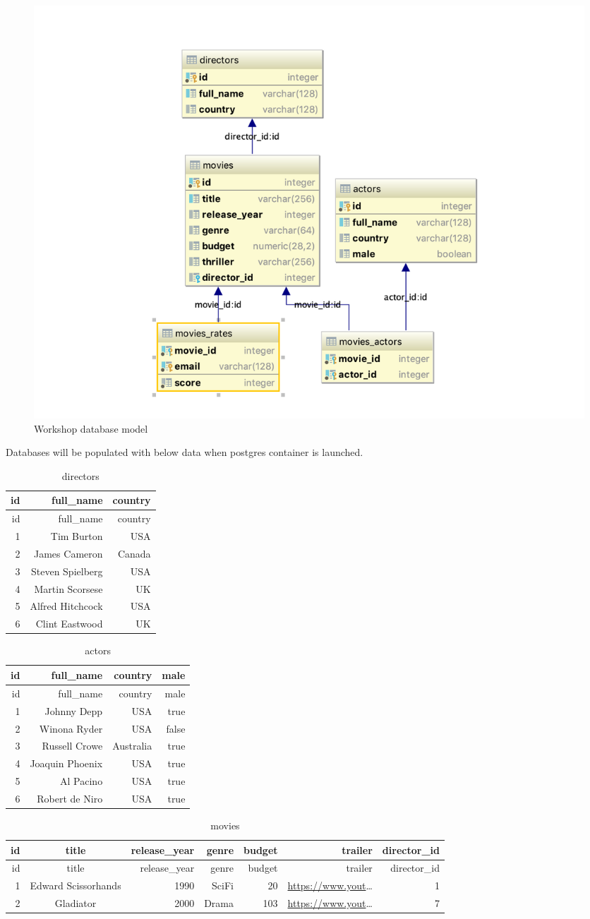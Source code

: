 \documentclass[]{book}
\begin{document}
\begin{figure}
\centering
\includegraphics{assets/database-model.png}
\caption{Workshop database model}
\end{figure}

Databases will be populated with below data when postgres container is
launched.

\begin{longtable}[]{@{}rrr@{}}
\caption{directors}\tabularnewline
\toprule
id & full\_name & country\tabularnewline
\midrule
\endfirsthead
\toprule
id & full\_name & country\tabularnewline
\midrule
\endhead
1 & Tim Burton & USA\tabularnewline
2 & James Cameron & Canada\tabularnewline
3 & Steven Spielberg & USA\tabularnewline
4 & Martin Scorsese & UK\tabularnewline
5 & Alfred Hitchcock & USA\tabularnewline
6 & Clint Eastwood & UK\tabularnewline
\bottomrule
\end{longtable}

\begin{longtable}[]{@{}rrrr@{}}
\caption{actors}\tabularnewline
\toprule
id & full\_name & country & male\tabularnewline
\midrule
\endfirsthead
\toprule
id & full\_name & country & male\tabularnewline
\midrule
\endhead
1 & Johnny Depp & USA & true\tabularnewline
2 & Winona Ryder & USA & false\tabularnewline
3 & Russell Crowe & Australia & true\tabularnewline
4 & Joaquin Phoenix & USA & true\tabularnewline
5 & Al Pacino & USA & true\tabularnewline
6 & Robert de Niro & USA & true\tabularnewline
\bottomrule
\end{longtable}

\begin{longtable}[]{@{}rcrrrrr@{}}
\caption{movies}\tabularnewline
\toprule
id & title & release\_year & genre & budget & trailer &
director\_id\tabularnewline
\midrule
\endfirsthead
\toprule
id & title & release\_year & genre & budget & trailer &
director\_id\tabularnewline
\midrule
\endhead
1 & Edward Scissorhands & 1990 & SciFi & 20 &
\url{https://www.yout}\ldots{} & 1\tabularnewline
2 & Gladiator & 2000 & Drama & 103 & \url{https://www.yout}\ldots{} &
7\tabularnewline
\bottomrule
\end{longtable}
\end{document}
